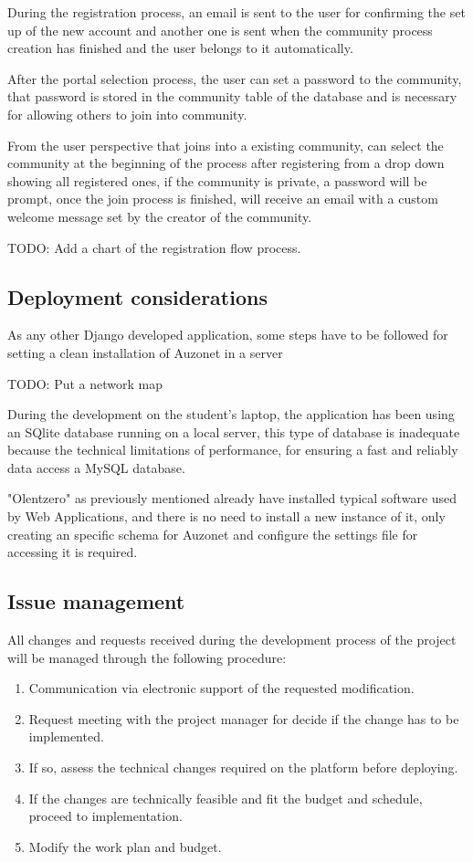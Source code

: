 \documentclass{DeustoFDP}
\begin{document}
During the registration process, an email is sent to the user for confirming the set up of the new account and another one is sent when the community process creation has finished and the user belongs to it automatically.

After the portal selection process, the user can set a password to the community, that password is stored in the community table of the database and is necessary for allowing others to join into community.

From the user perspective that joins into a existing community, can select the community at the beginning of the process after registering from a drop down showing all registered ones, if the community is private, a password will be prompt, once the join process is finished, will receive an email with a custom welcome message set by the creator of the community.

TODO: Add a chart of the registration flow process.

\subsection{Deployment considerations}
As any other Django developed application, some steps have to be followed for setting a clean installation of Auzonet in a server

TODO: Put a network map

During the development on the student's laptop, the application has been using an SQlite database running on a local server, this type of database is inadequate because the technical limitations of performance, for ensuring a fast and reliably data access a MySQL database. 

"Olentzero" as previously mentioned already have installed typical software used by Web Applications, and there is no need to install a new instance of it, only creating an specific schema for Auzonet and configure the settings file for accessing it is required. 

\subsection{Issue management}
All changes and requests received during the development process of the project will be managed through the following procedure:
\begin{enumerate}
	\item Communication via electronic support of the requested modification.
	\item Request meeting with the project manager for decide if the change has to be implemented.
	\item If so, assess the technical changes required on the platform before deploying.
	\item If the changes are technically feasible and fit the budget and schedule, proceed to implementation.
	\item Modify the work plan and budget.
\end{enumerate}
\end{document}

